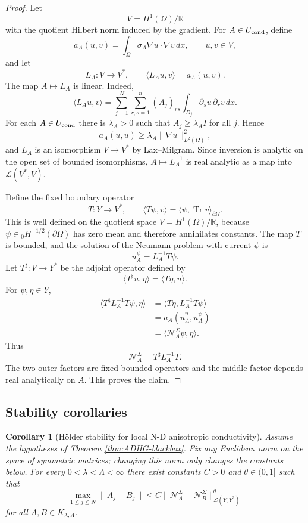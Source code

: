\documentclass[12pt,oneside]{amsart}
\newtheorem{corollary}[theorem]{Corollary}
\newcommand{\R}{\mathbb R}
\newcommand{\cL}{\mathcal L}
\newcommand{\cN}{\mathcal N}
\newcommand{\Tr}{\operatorname{Tr}}
\newcommand{\dual}[2]{\langle #1,#2\rangle}
\begin{document}
\begin{proof}
Let
\[
        V=H^1(\Omega)/\R
\]
with the quotient Hilbert norm induced by the gradient.  For \(A\in U_{\rm cond}\),
define
\[
        a_A(u,v)=\int_\Omega \sigma_A\nabla u\cdot\nabla v\,dx,
        \qquad u,v\in V,
\]
and let
\[
        L_A:V\to V^*,
        \qquad
        \dual{L_Au}{v}=a_A(u,v).
\]
The map \(A\mapsto L_A\) is linear.  Indeed,
\[
        \dual{L_Au}{v}
        =\sum_{j=1}^N\sum_{r,s=1}^n
        (A_j)_{rs}\int_{D_j}\partial_su\,\partial_rv\,dx .
\]
For each \(A\in U_{\rm cond}\) there is \(\lambda_A>0\) such that
\(A_j\ge \lambda_A I\) for all \(j\).  Hence
\[
        a_A(u,u)\ge \lambda_A\|\nabla u\|_{L^2(\Omega)}^2,
\]
and \(L_A\) is an isomorphism \(V\to V^*\) by Lax--Milgram.  Since inversion is
analytic on the open set of bounded isomorphisms, \(A\mapsto L_A^{-1}\) is real
analytic as a map into \(\cL(V^*,V)\).

Define the fixed boundary operator
\[
        T:Y\to V^*,
        \qquad
        \dual{T\psi}{v}=\dual{\psi}{\Tr v}_{\partial\Omega}.
\]
This is well defined on the quotient space \(V=H^1(\Omega)/\R\), because \(\psi\in{}_0H^{-1/2}(\partial\Omega)\) has zero mean and therefore annihilates constants.  The map \(T\) is bounded, and the solution of the Neumann problem with current
\(\psi\) is
\[
        u_A^\psi=L_A^{-1}T\psi .
\]
Let \(T^\sharp:V\to Y^*\) be the adjoint operator defined by
\[
        \dual{T^\sharp u}{\eta}=\dual{T\eta}{u}.
\]
For \(\psi,\eta\in Y\),
\[
\begin{aligned}
        \dual{T^\sharp L_A^{-1}T\psi}{\eta}
        &=\dual{T\eta}{L_A^{-1}T\psi}  \\
        &=a_A(u_A^\eta,u_A^\psi)       \\
        &=\dual{\cN_A^\Sigma\psi}{\eta}.
\end{aligned}
\]
Thus
\[
        \cN_A^\Sigma=T^\sharp L_A^{-1}T .
\]
The two outer factors are fixed bounded operators and the middle factor depends
real analytically on \(A\).  This proves the claim.
\end{proof}


\subsection{Stability corollaries}

\begin{corollary}[H\"older stability for local N-D anisotropic conductivity]\label{cor:cond-holder}
Assume the hypotheses of Theorem \ref{thm:ADHG-blackbox}.  Fix any Euclidean norm on the space of symmetric matrices; changing this norm only changes the constants below.  For every $0<\lambda<\Lambda<\infty$ there exist constants $C>0$ and $\theta\in(0,1]$ such that
\begin{equation}\label{eq:cond-holder}
        \max_{1\le j\le N}\|A_j-B_j\|
        \le C
        \|\cN_A^\Sigma-\cN_B^\Sigma\|_{\cL(Y,Y^*)}^\theta
\end{equation}
for all $A,B\in K_{\lambda,\Lambda}$.
\end{corollary}
\end{document}

